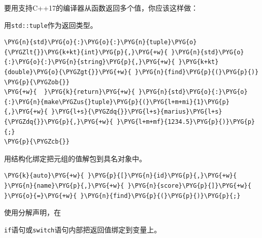 
要用支持C++17的编译器从函数返回多个值，你应该这样做：



用\texttt{std::\allowbreak{}tuple}作为返回类型。



\begin{codeblockbg}
\begin{Verbatim}[commandchars=\\\{\},breaklines=true,breakanywhere=true,fontsize=\codefont,xleftmargin=17bp]
\PYG{n}{std}\PYG{o}{:}\PYG{o}{:}\PYG{n}{tuple}\PYG{o}{\PYGZlt{}}\PYG{k+kt}{int}\PYG{p}{,}\PYG{+w}{ }\PYG{n}{std}\PYG{o}{:}\PYG{o}{:}\PYG{n}{string}\PYG{p}{,}\PYG{+w}{ }\PYG{k+kt}{double}\PYG{o}{\PYGZgt{}}\PYG{+w}{ }\PYG{n}{find}\PYG{p}{(}\PYG{p}{)}
\PYG{p}{\PYGZob{}}
\PYG{+w}{  }\PYG{k}{return}\PYG{+w}{ }\PYG{n}{std}\PYG{o}{:}\PYG{o}{:}\PYG{n}{make\PYGZus{}tuple}\PYG{p}{(}\PYG{l+m+mi}{1}\PYG{p}{,}\PYG{+w}{ }\PYG{l+s}{\PYGZdq{}}\PYG{l+s}{marius}\PYG{l+s}{\PYGZdq{}}\PYG{p}{,}\PYG{+w}{ }\PYG{l+m+mf}{1234.5}\PYG{p}{)}\PYG{p}{;}
\PYG{p}{\PYGZcb{}}
\end{Verbatim}
\end{codeblockbg}



用结构化绑定把元组的值解包到具名对象中。



\begin{codeblockbg}
\begin{Verbatim}[commandchars=\\\{\},breaklines=true,breakanywhere=true,fontsize=\codefont,xleftmargin=17bp]
\PYG{k}{auto}\PYG{+w}{ }\PYG{p}{[}\PYG{n}{id}\PYG{p}{,}\PYG{+w}{ }\PYG{n}{name}\PYG{p}{,}\PYG{+w}{ }\PYG{n}{score}\PYG{p}{]}\PYG{+w}{ }\PYG{o}{=}\PYG{+w}{ }\PYG{n}{find}\PYG{p}{(}\PYG{p}{)}\PYG{p}{;}
\end{Verbatim}
\end{codeblockbg}



使用分解声明，在



\texttt{if}语句或\texttt{switch}语句内部把返回值绑定到变量上。



